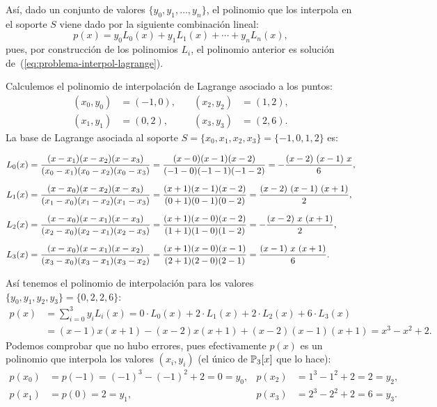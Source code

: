 Así, dado un conjunto de valores $\{y_0,y_1,\dots,y_n\}$, el polinomio
que los interpola en el soporte $S$ viene dado por la siguiente
combinación lineal:
\begin{equation}
  p(x)= y_0L_0(x) + y_1 L_1(x) + \cdots + y_n L_n(x),
\end{equation}
pues, por construcción de los polinomios $L_i$, el polinomio anterior
es solución de~(\ref{eq:problema-interpol-lagrange}).

\begin{example}
  \label{sec:formula-de-lagrange}
  Calculemos el polinomio de interpolación de Lagrange asociado a
  los puntos:
  \begin{align*}
    (x_0, y_0)&=(-1,0), &\quad (x_2, y_2)&=(1,2),\\ 
    (x_1, y_1)&=(0,2),   &\quad (x_3, y_3)&=(2,6).
  \end{align*}
  La base de Lagrange asociada al soporte
  $S=\{x_0,x_1,x_2,x_3\}=\{-1,0,1,2\}$ es:
  \begin{small}
    \begin{align*}
      L_0(x) & =
      \frac{(x-x_1)(x-x_2)(x-x_3)}{(x_0-x_1)(x_0-x_2)(x_0-x_3)} =
      \frac{(x-0)(x-1)(x-2)}{(-1-0)(-1-1)(-1-2)} =
      -{{\left(x-2\right)\,\left(x-1\right)\,x}\over{6}}, \\
      \noalign{\medskip} L_1(x) & =
      \frac{(x-x_0)(x-x_2)(x-x_3)}{(x_1-x_0)(x_1-x_2)(x_1-x_3)} =
      \frac{(x+1)(x-1)(x-2)}{(0+1)(0-1)(0-2)} =
      {{\left(x-2\right)\,\left(x-1\right)\,\left(x+1\right)}\over{2}},
      \\ \noalign{\medskip} L_2(x) & =
      \frac{(x-x_0)(x-x_1)(x-x_3)}{(x_2-x_0)(x_2-x_1)(x_2-x_3)} =
      \frac{(x+1)(x-0)(x-2)}{(1+1)(1-0)(1-2)} =
      -{{\left(x-2\right)\,x\,\left(x+1\right)}\over{2}}, \\
      \noalign{\medskip} L_3(x) & =
      \frac{(x-x_0)(x-x_1)(x-x_2)}{(x_3-x_0)(x_3-x_1)(x_3-x_2)} =
      \frac{(x+1)(x-0)(x-1)}{(2+1)(2-0)(2-1)} =
      {{\left(x-1\right)\,x\,\left(x+1\right)}\over{6}}.
    \end{align*}
  \end{small} 
  Así tenemos el polinomio de interpolación para los valores
  $\{y_0,y_1,y_2,y_3\}=\{0,2,2,6\}$:
  \begin{align*}
    p(x)&= \sum_{i=0}^3 y_iL_i(x) 
    = 0\cdot L_0(x) + 2\cdot L_1(x)+ 2\cdot L_2(x)+6\cdot L_3(x)
    \\ &=(x-1)x(x+1)-(x-2)x(x+1)+(x-2)(x-1)(x+1)
    =x^3-x^2+2.
  \end{align*}
  Podemos comprobar que no hubo errores, pues efectivamente $p(x)$ es
  un polinomio que interpola los valores
  $(x_i,y_i)$ (el único de $\operatorname{{\mathbb P}}_3[x]$ que lo hace):
  \begin{align*}
    p(x_0)&=p(-1)=(-1)^3-(-1)^2+2=0=y_0, & p(x_2)&=1^3-1^2+2 = 2=y_2, \\
    p(x_1)&=p(0) = 2=y_1, & p(x_3)&=2^3-2^2+2 = 6=y_3.
  \end{align*}
\end{example}

